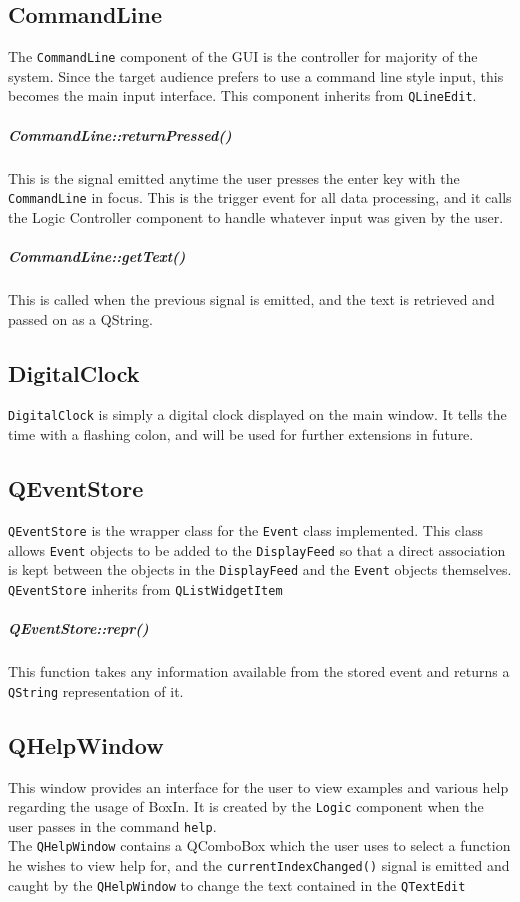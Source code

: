 \documentclass[12pt]{extarticle}
\begin{document}
\subsection{CommandLine}
The \texttt{CommandLine} component of the GUI is the controller for majority of the system. Since the target audience prefers to use a command line style input, this becomes the main input interface. This component inherits from \texttt{QLineEdit}.
\subparagraph{CommandLine::returnPressed()} This is the signal emitted anytime the user presses the enter key with the \texttt{CommandLine} in focus. This is the trigger event for all data processing, and it calls the Logic Controller component to handle whatever input was given by the user.
\subparagraph{CommandLine::getText()} This is called when the previous signal is emitted, and the text is retrieved and passed on as a QString.
\subsection{DigitalClock}
\texttt{DigitalClock} is simply a digital clock displayed on the main window. It tells the time with a flashing colon, and will be used for further extensions in future.
\subsection{QEventStore}
\texttt{QEventStore} is the wrapper class for the \texttt{Event} class implemented. This class allows \texttt{Event} objects to be added to the \texttt{DisplayFeed} so that a direct association is kept between the objects in the \texttt{DisplayFeed} and the \texttt{Event} objects themselves. \texttt{QEventStore} inherits from \texttt{QListWidgetItem}

\subparagraph{QEventStore::repr()} This function takes any information available from the stored event and returns a \texttt{QString} representation of it.

\subsection{QHelpWindow}
This window provides an interface for the user to view examples and various help regarding the usage of BoxIn. It is created by the \texttt{Logic} component when the user passes in the command \texttt{help}.\\
The \texttt{QHelpWindow} contains a QComboBox which the user uses to select a function he wishes to view help for, and the \texttt{currentIndexChanged()} signal is emitted and caught by the \texttt{QHelpWindow} to change the text contained in the \texttt{QTextEdit}
\newpage
\end{document}
